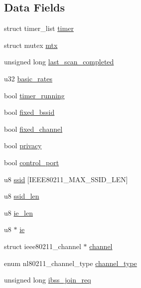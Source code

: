 \subsection*{Data Fields}
\begin{DoxyCompactItemize}
\item 
struct timer\-\_\-list \hyperlink{structieee80211__if__ibss_ae8aedee6c0bd2f7edbb10f18d574f107}{timer}
\item 
struct mutex \hyperlink{structieee80211__if__ibss_a06f637951b74c996f2e4987a7be1dbdd}{mtx}
\item 
unsigned long \hyperlink{structieee80211__if__ibss_a02630c17c918fc4068543524fa1c2793}{last\-\_\-scan\-\_\-completed}
\item 
u32 \hyperlink{structieee80211__if__ibss_a38fe4973d85ce09896a4da100ee7470d}{basic\-\_\-rates}
\item 
bool \hyperlink{structieee80211__if__ibss_a23958e610207eb28549d8d13255aa129}{timer\-\_\-running}
\item 
bool \hyperlink{structieee80211__if__ibss_a7930c3868b223ce60e12e84d087b3f58}{fixed\-\_\-bssid}
\item 
bool \hyperlink{structieee80211__if__ibss_aaeb95af3104d555b91418ca7b173e7ac}{fixed\-\_\-channel}
\item 
bool \hyperlink{structieee80211__if__ibss_a416c8f7c70b4e5fdcd31edb1cd9004ab}{privacy}
\item 
bool \hyperlink{structieee80211__if__ibss_a5f56e2447bde008fc2d675dcd029fc17}{control\-\_\-port}
\item 
u8 \hyperlink{structieee80211__if__ibss_ae8d768cff77168f424870b6745c90714}{ssid} \mbox{[}I\-E\-E\-E80211\-\_\-\-M\-A\-X\-\_\-\-S\-S\-I\-D\-\_\-\-L\-E\-N\mbox{]}
\item 
u8 \hyperlink{structieee80211__if__ibss_a440f44724caffefa0f9c838518a3c790}{ssid\-\_\-len}
\item 
u8 \hyperlink{structieee80211__if__ibss_a8e143706c80e5faf90dc4a385c4517f6}{ie\-\_\-len}
\item 
u8 $\ast$ \hyperlink{structieee80211__if__ibss_a837e19ab2bc08b5dec813ad916a6f09d}{ie}
\item 
struct ieee80211\-\_\-channel $\ast$ \hyperlink{structieee80211__if__ibss_a80252eb32e874a054a819044989184e2}{channel}
\item 
enum nl80211\-\_\-channel\-\_\-type \hyperlink{structieee80211__if__ibss_a54d35cd8a215e66908b8671a70fa4fca}{channel\-\_\-type}
\item 
unsigned long \hyperlink{structieee80211__if__ibss_a0557131126944ea730092a4df84149d7}{ibss\-\_\-join\-\_\-req}

\end{DoxyCompactItemize}
